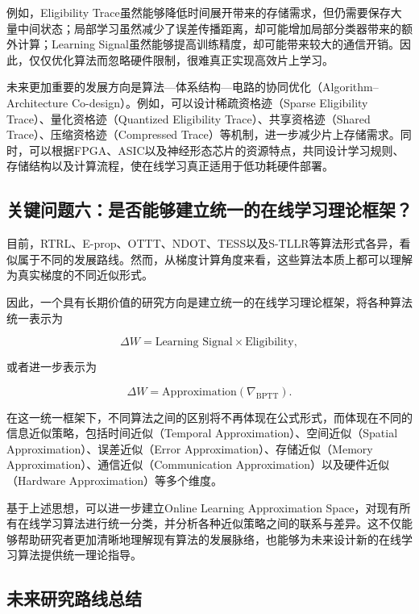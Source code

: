 \documentclass[11pt]{ctexart}
\begin{document}
例如，Eligibility Trace虽然能够降低时间展开带来的存储需求，但仍需要保存大量中间状态；局部学习虽然减少了误差传播距离，却可能增加局部分类器带来的额外计算；Learning Signal虽然能够提高训练精度，却可能带来较大的通信开销。因此，仅仅优化算法而忽略硬件限制，很难真正实现高效片上学习。

未来更加重要的发展方向是算法—体系结构—电路的协同优化（Algorithm–Architecture Co-design）。例如，可以设计稀疏资格迹（Sparse Eligibility Trace）、量化资格迹（Quantized Eligibility Trace）、共享资格迹（Shared Trace）、压缩资格迹（Compressed Trace）等机制，进一步减少片上存储需求。同时，可以根据FPGA、ASIC以及神经形态芯片的资源特点，共同设计学习规则、存储结构以及计算流程，使在线学习真正适用于低功耗硬件部署。


\subsection{关键问题六：是否能够建立统一的在线学习理论框架？}

目前，RTRL、E-prop、OTTT、NDOT、TESS以及S-TLLR等算法形式各异，看似属于不同的发展路线。然而，从梯度计算角度来看，这些算法本质上都可以理解为真实梯度的不同近似形式。

因此，一个具有长期价值的研究方向是建立统一的在线学习理论框架，将各种算法统一表示为

\[
\Delta W
=
\text{Learning Signal}
\times
\text{Eligibility},
\]

或者进一步表示为

\[
\Delta W
=
\mathrm{Approximation}
\left(
\nabla_{\mathrm{BPTT}}
\right).
\]

在这一统一框架下，不同算法之间的区别将不再体现在公式形式，而体现在不同的信息近似策略，包括时间近似（Temporal Approximation）、空间近似（Spatial Approximation）、误差近似（Error Approximation）、存储近似（Memory Approximation）、通信近似（Communication Approximation）以及硬件近似（Hardware Approximation）等多个维度。

基于上述思想，可以进一步建立Online Learning Approximation Space，对现有所有在线学习算法进行统一分类，并分析各种近似策略之间的联系与差异。这不仅能够帮助研究者更加清晰地理解现有算法的发展脉络，也能够为未来设计新的在线学习算法提供统一理论指导。


\subsection{未来研究路线总结}
\end{document}
